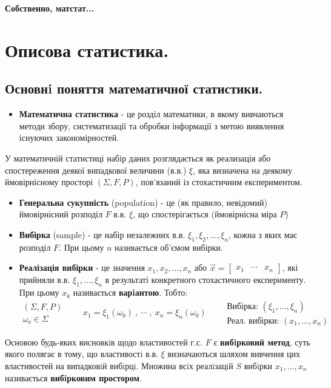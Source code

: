 \def\red#1{\textbf{\color{javared}#1}}
\def\blue#1{\textbf{\color{javadocblue}#1}}

\begin{center}
	\Huge \textbf{Собственно, матстат...}
\end{center}
\section{Описова статистика.}
\subsection{Основнi поняття математичної статистики.}
 \begin{itemize}
 \item\textbf{\color{javared} Математична статистика} - це розділ математики, в якому вивчаються методи збору, систематизації та обробки інформації з метою виявлення існуючих закономірностей.
   \end{itemize}
     У математичній статистиці набір даних розглядається як реализація або спостереження деякої випадкової величини (в.в.) $\xi$, яка визначена на деякому ймовірнісному просторі $\left( \Sigma, F, P \right)$, пов'язаний із стохастичним експериментом.
   \begin{itemize}
     \item \textbf{\color{javared} Генеральна сукупність} (population) -  це (як правило, невідомий) ймовірнісний розподіл $F$ в.в. $\xi$, що спостерігається (ймовірнісна міра $P$)
     \item \textbf{\color{javared} Вибірка} (sample) - це набір незалежних в.в. $\xi_1, \xi_2 ,..., \xi_n$, кожна з яких має розподіл $F$. При цьому $n$ називається об'ємом вибірки.
     \item \textbf{\color{javared} Реалізація вибірки} - це значення $x_1 , x_2 , ... , x_n$ або $\overrightarrow{x} = \begin{bmatrix}
      x_1 & \cdots & x_n
     \end{bmatrix}$, які прийняли в.в. $\xi_1 , ... , \xi_n$ в результаті конкретного стохастичного експерименту. При цьому $x_k$ називається \textbf{\color{javadocblue} варiантою}. Тобто:
     $$
     \begin{gathered}
      \left( \Sigma , F, P \right)\\
      \omega_o \in \Sigma
     \end{gathered} \qquad x_1 = \xi_1(\omega_0)\ , \ \cdots \ , \  x_n  = \xi_n (\omega_0) \qquad \begin{array}{r}
      \text{Вибірка: } (\xi_1 , ..., \xi_n) \\
      \text{Реал. вибірки: } (x_1 , ... , x_n)
     \end{array}
     $$
 \end{itemize}
Основою будь-яких висновкiв щодо властивостей г.с. $F$ є \textbf{\color{javadocblue} вибiрковий метод}, суть якого полягає в тому, що властивостi в.в. $\xi$
визначаються шляхом вивчення цих властивостей
на випадковiй вибiрцi. Множина всiх реалiзацiй $S$ вибiрки $x_1 , \dots , x_n$ називається \textbf{\color{javadocblue} вибiрковим простором}.

